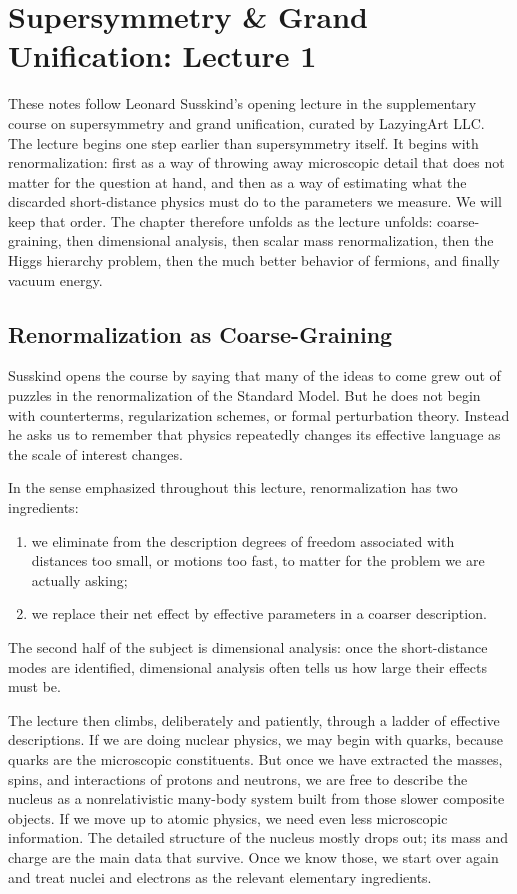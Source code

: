 \chapter{Supersymmetry \& Grand Unification: Lecture 1}

These notes follow Leonard Susskind's opening lecture in the supplementary course on supersymmetry and grand unification, curated by LazyingArt LLC. The lecture begins one step earlier than supersymmetry itself. It begins with renormalization: first as a way of throwing away microscopic detail that does not matter for the question at hand, and then as a way of estimating what the discarded short-distance physics must do to the parameters we measure. We will keep that order. The chapter therefore unfolds as the lecture unfolds: coarse-graining, then dimensional analysis, then scalar mass renormalization, then the Higgs hierarchy problem, then the much better behavior of fermions, and finally vacuum energy.

\section{Renormalization as Coarse-Graining}

Susskind opens the course by saying that many of the ideas to come grew out of puzzles in the renormalization of the Standard Model. But he does not begin with counterterms, regularization schemes, or formal perturbation theory. Instead he asks us to remember that physics repeatedly changes its effective language as the scale of interest changes.

\begin{definition}
In the sense emphasized throughout this lecture, renormalization has two ingredients:
\begin{enumerate}
\item we eliminate from the description degrees of freedom associated with distances too small, or motions too fast, to matter for the problem we are actually asking;
\item we replace their net effect by effective parameters in a coarser description.
\end{enumerate}
The second half of the subject is dimensional analysis: once the short-distance modes are identified, dimensional analysis often tells us how large their effects must be.
\end{definition}

The lecture then climbs, deliberately and patiently, through a ladder of effective descriptions. If we are doing nuclear physics, we may begin with quarks, because quarks are the microscopic constituents. But once we have extracted the masses, spins, and interactions of protons and neutrons, we are free to describe the nucleus as a nonrelativistic many-body system built from those slower composite objects. If we move up to atomic physics, we need even less microscopic information. The detailed structure of the nucleus mostly drops out; its mass and charge are the main data that survive. Once we know those, we start over again and treat nuclei and electrons as the relevant elementary ingredients.

